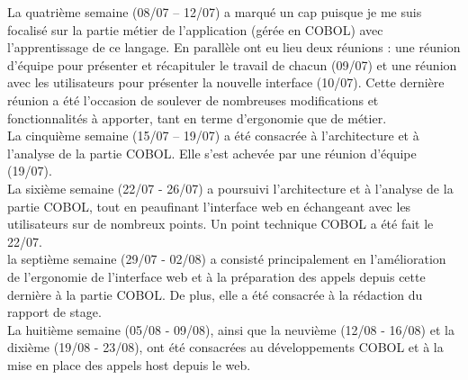 \documentclass[a4paper,french,8pt]{article}
\begin{document}
		La quatrième semaine (08/07 – 12/07) a marqué un cap puisque je me suis focalisé sur la partie métier de l’application (gérée en COBOL) avec l’apprentissage de ce langage. 
		En parallèle ont eu lieu deux réunions : une réunion d’équipe pour présenter et récapituler le travail de chacun (09/07) et une réunion avec les utilisateurs pour présenter la nouvelle interface (10/07). 
		Cette dernière réunion a été l’occasion de soulever de nombreuses modifications et fonctionnalités à apporter, tant en terme d’ergonomie que de métier.\\

		La cinquième semaine (15/07 – 19/07) a été consacrée à l’architecture et à l’analyse de la partie COBOL. Elle s’est achevée par une réunion d’équipe (19/07). \\ 
		
		La sixième semaine (22/07 - 26/07) a poursuivi l’architecture et à l’analyse de la partie COBOL, tout en peaufinant l'interface web en échangeant avec les utilisateurs sur de nombreux points.
		Un point technique COBOL a été fait le 22/07.\\ 
		
		la septième semaine (29/07 - 02/08) a consisté principalement en l'amélioration de l'ergonomie de l'interface web et à la préparation des appels depuis cette dernière à la partie COBOL. De plus,
		elle a été consacrée à la rédaction du rapport de stage.
		\\ 
		
		La huitième semaine (05/08 - 09/08), ainsi que la neuvième (12/08 - 16/08) et la dixième (19/08 - 23/08), ont été consacrées au développements COBOL 
		et à la mise en place des appels host depuis le web.\\ 
	
\end{document}
